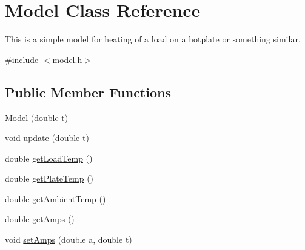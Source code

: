 \hypertarget{class_model}{}\section{Model Class Reference}
\label{class_model}


This is a simple model for heating of a load on a hotplate or something similar.  




{\ttfamily \#include $<$model.\+h$>$}

\subsection*{Public Member Functions}
\begin{DoxyCompactItemize}
\item 
\mbox{\hyperlink{class_model_abebd94be0a8a1c0f0bd40ade2c4efb71}{Model}} (double t)
\item 
void \mbox{\hyperlink{class_model_a30a27a8a0abd98981f23815037f1cd5a}{update}} (double t)
\item 
double \mbox{\hyperlink{class_model_aa308543029550abb6da1ee0f4fe8581f}{get\+Load\+Temp}} ()
\item 
double \mbox{\hyperlink{class_model_a5aea080a5b4ca3283401ed1ef761d219}{get\+Plate\+Temp}} ()
\item 
double \mbox{\hyperlink{class_model_a3fa2494f0e4d817ed2c96c6e8d4fa8ca}{get\+Ambient\+Temp}} ()
\item 
double \mbox{\hyperlink{class_model_a56bbe0e7ef9e17d358a1bed355fcb192}{get\+Amps}} ()
\item 
void \mbox{\hyperlink{class_model_a38da3e25e7d135712c94e1274cd4389c}{set\+Amps}} (double a, double t)
\end{DoxyCompactItemize}
